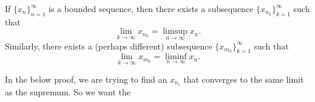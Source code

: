\documentclass[../main.tex]{subfiles}
\begin{document}
    
    
    
    
    
    
    
    
    
    
    
    
    
    
    
    
    
    
    
    
    
    
    
    
    
    
    
    
    
    
    
    
    \begin{theorem}\label{thm: lim sup lim inf subsequence}
    If \( \{x_n\}_{n=1}^{\infty} \) is a bounded sequence, then there exists a subsequence \( \{x_{n_k}\}_{k=1}^{\infty} \) such that
    \[
    \lim_{k \to \infty} x_{n_k} = \limsup_{n \to \infty} x_n.
    \]
    Similarly, there exists a (perhaps different) subsequence \( \{x_{m_k}\}_{k=1}^{\infty} \) such that
    \[
    \lim_{k \to \infty} x_{m_k} = \liminf_{n \to \infty} x_n.
    \]
    \end{theorem}
    
    
    
    
    \begin{remark}
        In the below proof, we are trying to find an \(x_{n_i}\) that converges to the same limit as the supremum. So we want the  
    \end{remark}
    
    
    
    
    
\end{document}
